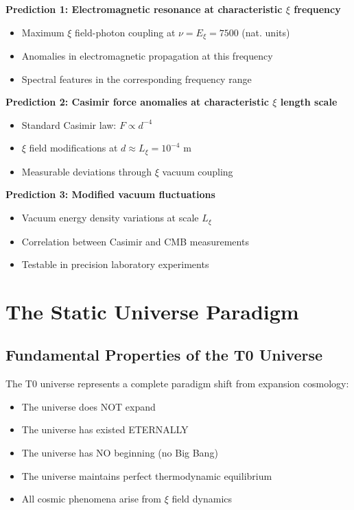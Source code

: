	\textbf{Prediction 1: Electromagnetic resonance at characteristic $\xi$ frequency}
	\begin{itemize}
		\item Maximum $\xi$ field-photon coupling at $\nu = E_\xi = 7500$ (nat. units)
		\item Anomalies in electromagnetic propagation at this frequency
		\item Spectral features in the corresponding frequency range
	\end{itemize}
	
	\textbf{Prediction 2: Casimir force anomalies at characteristic $\xi$ length scale}
	\begin{itemize}
		\item Standard Casimir law: $F \propto d^{-4}$
		\item $\xi$ field modifications at $d \approx L_\xi = 10^{-4}$ m
		\item Measurable deviations through $\xi$ vacuum coupling
	\end{itemize}
	
	\textbf{Prediction 3: Modified vacuum fluctuations}
	\begin{itemize}
		\item Vacuum energy density variations at scale $L_\xi$
		\item Correlation between Casimir and CMB measurements
		\item Testable in precision laboratory experiments
	\end{itemize}
	
	\section{The Static Universe Paradigm}
	
	\subsection{Fundamental Properties of the T0 Universe}
	
	\begin{revolutionary}
		The T0 universe represents a complete paradigm shift from expansion cosmology:
		\begin{itemize}
			\item The universe does NOT expand
			\item The universe has existed ETERNALLY
			\item The universe has NO beginning (no Big Bang)
			\item The universe maintains perfect thermodynamic equilibrium
			\item All cosmic phenomena arise from $\xi$ field dynamics
		\end{itemize}
	\end{revolutionary}
	
